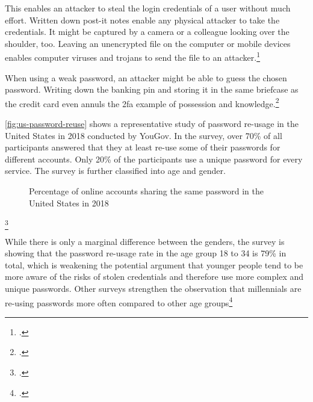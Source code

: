 This enables an attacker to steal the login credentials of a user without much effort. Written down post-it notes enable any physical attacker to take the credentials. It might be captured by a camera or a colleague looking over the shoulder, too. Leaving an unencrypted file on the computer or mobile devices enables computer viruses and trojans to send the file to an attacker.\footcites[See][Chapter 4.1]{kissell2019take}

When using a weak password, an attacker might be able to guess the chosen password. Writing down the banking \gls{pin} and storing it in the same briefcase as the credit card even annuls the \gls{2fa} example of possession and knowledge.\footcites[See][xxi]{swenson2012modern}

\autoref{fig:us-password-reuse} shows a representative study of password re-usage in the United States in 2018 conducted by YouGov. In the survey, over 70\% of all participants answered that they at least re-use some of their passwords for different accounts. Only 20\% of the participants use a unique password for every service. The survey is further classified into age and gender. 

\begin{figure}[h]
	\begin{bchart}[min=5, max=55, step=10, unit=\%, scale=1.2]
		\medskip
		\medskip
		\bigskip
		\bigskip
	\end{bchart}
	\caption[Percentage of online accounts sharing the same password in the United States in 2018]{Percentage of online accounts sharing the same password in the United States in 2018\footnotemark}
	\label{fig:us-password-reuse}
\end{figure}
\footcitetext[Source:][8]{yougov}

While there is only a marginal difference between the genders, the survey is showing that the password re-usage rate in the age group 18 to 34 is 79\% in total, which is weakening the potential argument that younger people tend to be more aware of the risks of stolen credentials and therefore use more complex and unique passwords. Other surveys strengthen the observation that millennials are re-using passwords more often compared to other age groups\footcites[See][10]{ibm-security}[See][8]{yougov}[See][11]{lastpass}[See][1429]{Thomas:2017:DBP:3133956.3134067}

